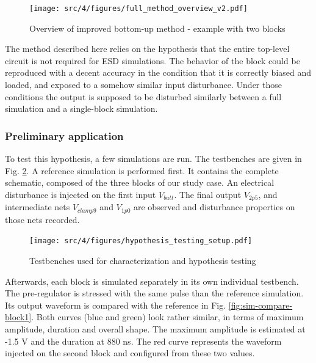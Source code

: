 \begin{figure}[!hp]
  \centering
  \texttt{[image: src/4/figures/full\_method\_overview\_v2.pdf]}
  \caption{Overview of improved bottom-up method - example with two blocks}
  \label{fig:full-method-v2}
\end{figure}

The method described here relies on the hypothesis that the entire top-level circuit is not required for ESD simulations.
The behavior of the block could be reproduced with a decent accuracy in the condition that it is correctly biased and loaded, and exposed to a somehow similar input disturbance.
Under those conditions the output is supposed to be disturbed similarly between a full simulation and a single-block simulation.

\subsubsection{Preliminary application}
To test this hypothesis, a few simulations are run.
The testbenches are given in Fig. \ref{fig:hypothesis-setup}.
A reference simulation is performed first.
It contains the complete schematic, composed of the three blocks of our study case.
An electrical disturbance is injected on the first input $V_{batt}$.
The final output $V_{2p5}$, and intermediate nets $V_{clamp9}$ and $V_{1p0}$ are observed and disturbance properties on those nets recorded.

\begin{figure}[!h]
  \centering
  \texttt{[image: src/4/figures/hypothesis\_testing\_setup.pdf]}
  \caption{Testbenches used for characterization and hypothesis testing}
  \label{fig:hypothesis-setup}
\end{figure}

Afterwards, each block is simulated separately in its own individual testbench.
The pre-regulator is stressed with the same pulse than the reference simulation.
Its output waveform is compared with the reference in Fig. \ref{fig:sim-compare-block1}.
Both curves (blue and green) look rather similar, in terms of maximum amplitude, duration and overall shape.
The maximum amplitude is estimated at -1.5 V and the duration at 880 ns.
The red curve represents the waveform injected on the second block and configured from these two values.

